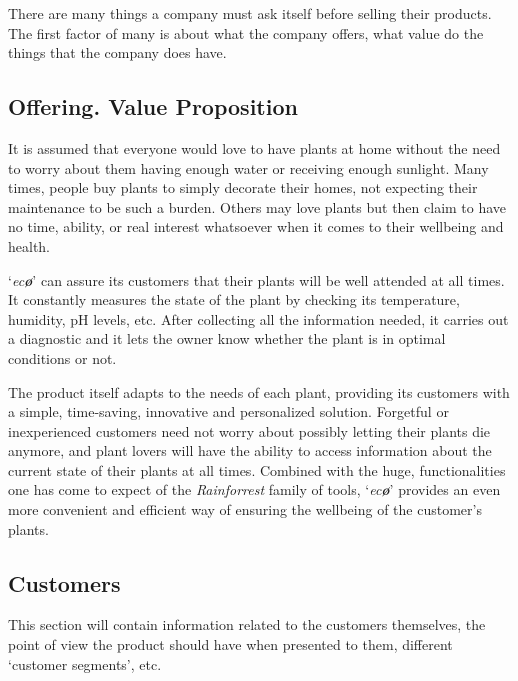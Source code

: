 \documentclass[english,runningheads,a4paper]{llncs}[2018/03/10]
\begin{document}
There are many things a company must ask itself before selling their products.
The first factor of many is about what the company offers, what value do the
things that the company does have.


    \subsection*{Offering. Value Proposition}

    It is assumed that everyone would love to have plants at home without the
    need to worry about them having enough water or receiving enough sunlight.
    Many times, people buy plants to simply decorate their homes, not expecting
    their maintenance to be such a burden. Others may love plants but then claim
    to have no time, ability, or real interest whatsoever when it comes to
    their wellbeing and health.

    `\textit{ec\textbf{\o}}' can assure its customers that their plants will be
    well attended at all times. It constantly measures the state of the plant by
    checking its temperature, humidity, pH levels, etc. After collecting all the
    information needed, it carries out a diagnostic and it lets the owner know
    whether the plant is in optimal conditions or not.

    The product itself adapts to the needs of each plant, providing its
    customers with a simple, time-saving, innovative and personalized solution.
    Forgetful or inexperienced customers need not worry about possibly letting
    their plants die anymore, and plant lovers will have the ability to access
    information about the current state of their plants at all times. Combined
    with the huge, functionalities one has come to expect of the
    \textit{Rainforrest} family of tools, `\textit{ec\textbf{\o}}' provides an
    even more convenient and efficient way of ensuring the wellbeing of the
    customer's plants.


    \subsection*{Customers}

    This section will contain information related to the customers themselves,
    the point of view the product should have when presented to them, different
    `customer segments', etc.
\end{document}

